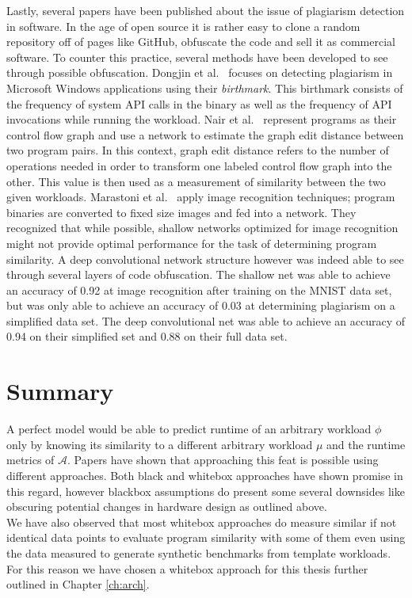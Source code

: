 \documentclass[../bachelor_paper.tex]{subfiles}
\begin{document}
Lastly, several papers have been published about the issue of plagiarism detection in software. In the age of open source it is rather easy to clone a random repository off of pages like GitHub, obfuscate the code and sell it as commercial software. To counter this practice, several methods have been developed to see through possible obfuscation. Dongjin et al.\ \cite{kimMeasuringSimilarityWindows2013} focuses on detecting plagiarism in Microsoft Windows applications using their \emph{birthmark}. This birthmark consists of the frequency of system \acs{API} calls in the binary as well as the frequency of \acs{API} invocations while running the workload. Nair et al.\ \cite{nairFuncGNNGraphNeural2020} represent programs as their control flow graph and use a network to estimate the graph edit distance between two program pairs. In this context, graph edit distance refers to the number of operations needed in order to transform one labeled control flow graph into the other. This value is then used as a measurement of similarity between the two given workloads. Marastoni et al.\ \cite{marastoniDeepLearningApproach2018} apply image recognition techniques; program binaries are converted to fixed size images and fed into a network. They recognized that while possible, shallow networks optimized for image recognition might not provide optimal performance for the task of determining program similarity. A deep convolutional network structure however was indeed able to see through several layers of code obfuscation. The shallow net was able to achieve an accuracy of 0.92 at image recognition after training on the MNIST data set, but was only able to achieve an accuracy of 0.03 at determining plagiarism on a simplified data set. The deep convolutional net was able to achieve an accuracy of 0.94 on their simplified set and 0.88 on their full data set.

\section{Summary}
	\label{ch:theo/simi/summ}
A perfect model would be able to predict runtime of an arbitrary workload $\phi$ only by knowing its similarity to a different arbitrary workload $\mu$ and the runtime metrics of $\mathcal{A}$. Papers have shown that approaching this feat is possible using different approaches. Both black and whitebox approaches have shown promise in this regard, however blackbox assumptions do present some several downsides like obscuring potential changes in hardware design as outlined above.\\
We have also observed that most whitebox approaches do measure similar if not identical data points to evaluate program similarity with some of them even using the data measured to generate synthetic benchmarks from template workloads. For this reason we have chosen a whitebox approach for this thesis further outlined in Chapter \ref{ch:arch}.



\isstandalone



\fi
\end{document}
